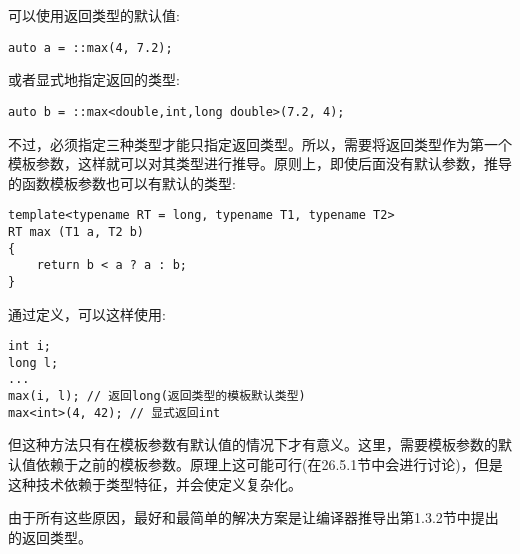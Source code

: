 可以使用返回类型的默认值:

\begin{lstlisting}[style=styleCXX]
auto a = ::max(4, 7.2);
\end{lstlisting}

或者显式地指定返回的类型:

\begin{lstlisting}[style=styleCXX]
auto b = ::max<double,int,long double>(7.2, 4);
\end{lstlisting}

不过，必须指定三种类型才能只指定返回类型。所以，需要将返回类型作为第一个模板参数，这样就可以对其类型进行推导。原则上，即使后面没有默认参数，推导的函数模板参数也可以有默认的类型:

\begin{lstlisting}[style=styleCXX]
template<typename RT = long, typename T1, typename T2>
RT max (T1 a, T2 b)
{
	return b < a ? a : b;
}
\end{lstlisting}

通过定义，可以这样使用:

\begin{lstlisting}[style=styleCXX]
int i;
long l;
...
max(i, l); // 返回long(返回类型的模板默认类型)
max<int>(4, 42); // 显式返回int
\end{lstlisting}

但这种方法只有在模板参数有默认值的情况下才有意义。这里，需要模板参数的默认值依赖于之前的模板参数。原理上这可能可行(在26.5.1节中会进行讨论)，但是这种技术依赖于类型特征，并会使定义复杂化。

由于所有这些原因，最好和最简单的解决方案是让编译器推导出第1.3.2节中提出的返回类型。
